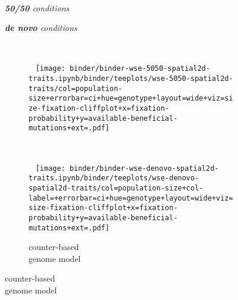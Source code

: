 \begin{figure}[h]
  \captionsetup[subfigure]{justification=raggedright}
  \begin{minipage}{\textwidth}

    \begin{minipage}{0.1\textwidth}~\end{minipage}%
    \begin{minipage}{0.35\textwidth}
      \centering
      \itshape
      {\large
      \textbf{50/50} conditions
      }
    \end{minipage}%
    \begin{minipage}{0.45\textwidth}
      \centering
      \itshape
      {\large
      \textbf{de novo} conditions
      }
    \end{minipage}

    ~\vspace{-0.7ex}

    \begin{subfigure}[b]{\linewidth}
        \begin{minipage}{0.42\textwidth}
          ~
          \texttt{[image: binder/binder-wse-5050-spatial2d-traits.ipynb/binder/teeplots/wse-5050-spatial2d-traits/col=population-size+errorbar=ci+hue=genotype+layout=wide+viz=size-fixation-cliffplot+x=fixation-probability+y=available-beneficial-mutations+ext=.pdf]}%
        \end{minipage}%
        \begin{minipage}{0.06\textwidth}
          ~
        \end{minipage}%
        \begin{minipage}{0.38\textwidth}
          ~
          \texttt{[image: binder/binder-wse-denovo-spatial2d-traits.ipynb/binder/teeplots/wse-denovo-spatial2d-traits/col=population-size+col-label=+errorbar=ci+hue=genotype+layout=wide+viz=size-fixation-cliffplot+x=fixation-probability+y=available-beneficial-mutations+ext=.pdf]}%
        \end{minipage}%
      \begin{minipage}{0.12\textwidth}
        \raggedright
        \large
        \caption{counter-based\\ genome model}
        \label{fig:denovo-5050-conditions:poisson}
        \vspace{20ex}
      \end{minipage}%
    \end{subfigure}%


\end{minipage}
\end{figure}

